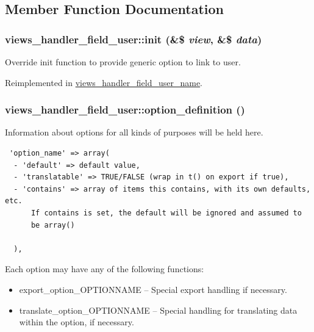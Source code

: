 \subsection{Member Function Documentation}
\hypertarget{classviews__handler__field__user_94156733dfddeb57dbd856e0f574cde6}{
\subsubsection[{init}]{\setlength{\rightskip}{0pt plus 5cm}views\_\-handler\_\-field\_\-user::init (\&\$ {\em view}, \/  \&\$ {\em data})}}
\label{classviews__handler__field__user_94156733dfddeb57dbd856e0f574cde6}


Override init function to provide generic option to link to user. 

Reimplemented in \hyperlink{classviews__handler__field__user__name_5879bbaa4a1e59f9509b9a5d6fbdd9b2}{views\_\-handler\_\-field\_\-user\_\-name}.\hypertarget{classviews__handler__field__user_545d229a041bf920b95ac59d89b1e4b2}{
\subsubsection[{option\_\-definition}]{\setlength{\rightskip}{0pt plus 5cm}views\_\-handler\_\-field\_\-user::option\_\-definition ()}}
\label{classviews__handler__field__user_545d229a041bf920b95ac59d89b1e4b2}


Information about options for all kinds of purposes will be held here. 

\begin{Code}\begin{verbatim} 'option_name' => array(
  - 'default' => default value,
  - 'translatable' => TRUE/FALSE (wrap in t() on export if true),
  - 'contains' => array of items this contains, with its own defaults, etc.
      If contains is set, the default will be ignored and assumed to
      be array()

  ),
\end{verbatim}
\end{Code}

 Each option may have any of the following functions:\begin{itemize}
\item export\_\-option\_\-OPTIONNAME -- Special export handling if necessary.\item translate\_\-option\_\-OPTIONNAME -- Special handling for translating data within the option, if necessary. \end{itemize}


